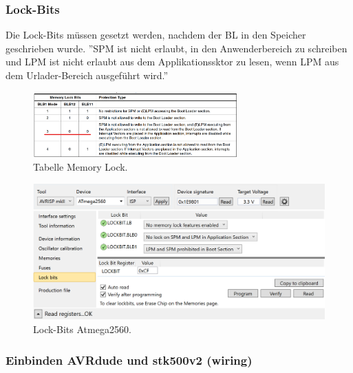\subsubsection{Lock-Bits}

Die Lock-Bits müssen gesetzt werden, nachdem der BL in den Speicher geschrieben wurde. ''SPM ist nicht erlaubt, in den Anwenderbereich zu schreiben und LPM ist nicht erlaubt aus dem Applikationssktor zu lesen, wenn LPM aus dem Urlader-Bereich ausgeführt wird.''


\begin{figure}[H]
	\centering
	\includegraphics[width=0.7\textwidth]{graphics/Tabelle_Memory_Lock}
	\caption{Tabelle Memory Lock.}
	\label{fig:Tabelle_Memory_Lock}
\end{figure}



\begin{figure}[H]
	\centering
	\includegraphics[width=\textwidth]{graphics/AtmelStudio_Locks}
	\caption{Lock-Bits Atmega2560.}
	\label{fig:AtmelStudio_Locks}
\end{figure}


\subsubsection{Einbinden AVRdude und stk500v2 (wiring)}\label{Appendix:AVR_STK500}

